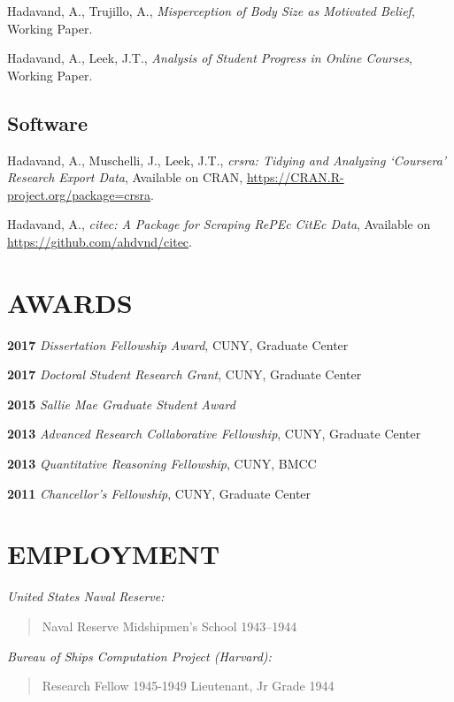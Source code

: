 \documentclass[10pt,]{article}
\begin{document}
Hadavand, A., Trujillo, A., \emph{Misperception of Body Size as
Motivated Belief}, Working Paper.

Hadavand, A., Leek, J.T., \emph{Analysis of Student Progress in Online
Courses}, Working Paper.

\hypertarget{software}{%
\subsection{\texorpdfstring{\textbf{Software}}{Software}}\label{software}}

Hadavand, A., Muschelli, J., Leek, J.T., \emph{crsra: Tidying and
Analyzing `Coursera' Research Export Data}, Available on CRAN,
\url{https://CRAN.R-project.org/package=crsra}.

Hadavand, A., \emph{citec: A Package for Scraping RePEc CitEc Data},
Available on \url{https://github.com/ahdvnd/citec}.

\hypertarget{awards}{%
\section{AWARDS}\label{awards}}

\textbf{2017} \emph{Dissertation Fellowship Award}, CUNY, Graduate
Center

\textbf{2017} \emph{Doctoral Student Research Grant}, CUNY, Graduate
Center

\textbf{2015} \emph{Sallie Mae Graduate Student Award}

\textbf{2013} \emph{Advanced Research Collaborative Fellowship}, CUNY,
Graduate Center

\textbf{2013} \emph{Quantitative Reasoning Fellowship}, CUNY, BMCC

\textbf{2011} \emph{Chancellor's Fellowship}, CUNY, Graduate Center

\hypertarget{employment}{%
\section{EMPLOYMENT}\label{employment}}

\emph{United States Naval Reserve:}

\begin{quote}
Naval Reserve Midshipmen's School \hfill 1943--1944
\end{quote}

\emph{Bureau of Ships Computation Project (Harvard):}

\begin{quote}
Research Fellow \hfill 1945-1949 Lieutenant, Jr Grade \hfill 1944
\end{quote}
\end{document}
